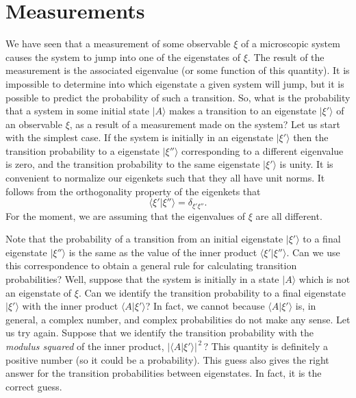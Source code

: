\section{Measurements}\label{s2.10}
We have seen that a measurement of some observable $\xi$ of a microscopic
system causes the system to jump into one of the eigenstates of $\xi$. The
result of the measurement is the associated eigenvalue (or some function of
this quantity). It is impossible to determine into which eigenstate a 
given system will jump, but it is possible to predict the probability of
such a transition. So, what is the probability that a system in some
initial state $|A\rangle$ makes a transition to an eigenstate $|\xi'\rangle$
of an observable $\xi$, as a result of a measurement made on the system? 
Let us start with the simplest case. If the system is initially in an eigenstate
$|\xi'\rangle$ then the transition probability to a eigenstate $|\xi''\rangle$
corresponding to a different eigenvalue is zero, and the transition probability
to the same eigenstate $|\xi'\rangle$ is unity. It is convenient to normalize 
our eigenkets such that they all have unit norms. It follows from the
orthogonality property of the eigenkets that
\begin{equation}\label{e2.48}
\langle \xi'|\xi''\rangle = \delta_{\xi' \xi''}.
\end{equation}
For the moment, we are assuming that  the eigenvalues of $\xi$ 
 are all different.

Note that the probability of a transition from an initial eigenstate
$|\xi'\rangle$ to a final eigenstate $|\xi''\rangle$ is the same as
the value of the  inner product
$\langle \xi'|\xi''\rangle$. Can we use  this correspondence 
to obtain  a general rule for
calculating transition probabilities? Well, suppose that the system is initially
in a state $|A\rangle$ which is not an eigenstate of $\xi$. Can we
identify the transition probability to a final eigenstate $|\xi'\rangle$ with
the inner product $\langle A| \xi'\rangle$?  In fact, we cannot
because  $\langle A| \xi'\rangle$ is, in general, a complex number, and complex
probabilities do not make any sense. Let us try again.  Suppose that we
identify the transition probability with the {\em modulus squared}\/ of the
inner product, $|\langle A| \xi'\rangle|^{\,2}$\,? This 
quantity is definitely a positive
number (so it could be a probability). This guess also gives the right answer for
the transition probabilities between eigenstates. In fact, it is the
correct guess.

